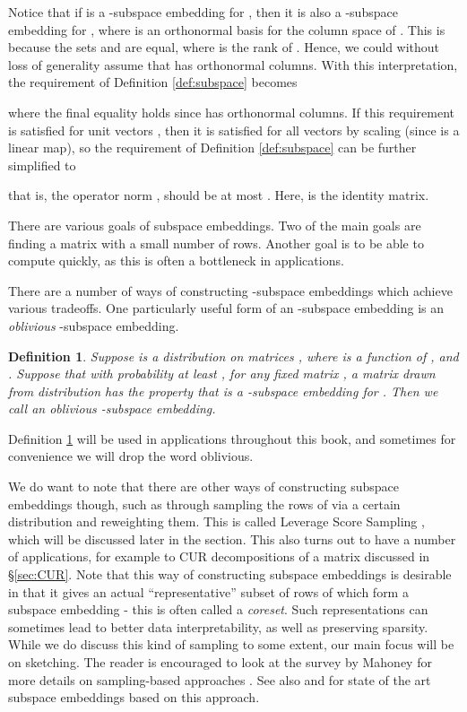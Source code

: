 \documentclass[11pt]{article}
\newtheorem{definition}[theorem]{Definition}
\begin{document}
Notice that if  is a  -subspace embedding for , then it is also a
 -subspace embedding for , where  is an orthonormal basis for the column
space of . This is because the sets 
 and 
are equal, where  is the rank of . 
Hence, we could without loss of generality assume that  has orthonormal columns. With 
this interpretation, the requirement of Definition \ref{def:subspace} becomes

where the final equality holds since  has orthonormal columns. If this requirement is satisfied
for unit vectors , then it is satisfied for all vectors  by scaling (since  is a linear
map), so the requirement
of Definition \ref{def:subspace} can be further simplified to

that is, the operator norm , 
should be at most . Here,  is the  identity matrix. 

There are various goals of subspace embeddings. Two of the main goals are finding a matrix  with a small
number of rows. Another goal is to be able to compute  quickly, as this is often a bottleneck
in applications. 

There are a number of ways of constructing -subspace embeddings which achieve various tradeoffs. 
One particularly useful form of an -subspace embedding is an {\it oblivious} -subspace 
embedding.

\begin{definition}\label{def:oblSubspace}
Suppose  is a distribution on  matrices , where 
is a function of , and . 
Suppose that with probability at least , for any fixed  matrix ,
a matrix  drawn from 
distribution  has the property
that  is a 
 -subspace embedding for . Then
we call  an  oblivious -subspace embedding. 
\end{definition}

Definition \ref{def:oblSubspace} 
will be used in applications throughout this book, and sometimes for convenience
we will drop the word oblivious. 

We do want to note that there are other ways of constructing subspace embeddings
though, such as through sampling the rows of  via a certain distribution and reweighting them. 
This is called Leverage Score Sampling \cite{DMM06a,DMM061,DMM062,DMMS07},
which will be discussed later in the section. This also turns out to have a number of applications, for example
to CUR decompositions of a matrix discussed in \S\ref{sec:CUR}. Note that this way of constructing subspace
embeddings is desirable in that it gives an actual ``representative'' subset of rows of  which form
a subspace embedding - this is often called a {\it coreset}. Such representations can sometimes lead to better
data interpretability, as well as preserving sparsity. While we do discuss this kind of sampling to some
extent, our main focus will be on sketching. The reader is encouraged to look at the survey by Mahoney
for more details on sampling-based approaches \cite{m11}. See also \cite{lmp13} and \cite{clmmps14} for 
state of the art subspace embeddings based on this approach. 
\end{document}
